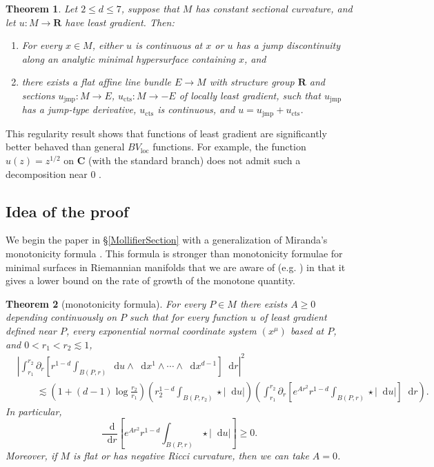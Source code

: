 \documentclass[reqno,10pt]{amsart}
\newcommand{\RR}{\mathbf{R}}
\newcommand{\CC}{\mathbf{C}}
\newcommand*\dif{\mathop{}\!\mathrm{d}}
\newcommand{\loc}{\mathrm{loc}}
\newtheorem{mainthm}{Theorem}
\theoremstyle{definition}
\numberwithin{equation}{section}
\begin{document}
\begin{mainthm}\label{Gorny regularity}
Let $2 \leq d \leq 7$, suppose that $M$ has constant sectional curvature, and let $u: M \to \RR$ have least gradient.
Then:
\begin{enumerate}
\item For every $x \in M$, either $u$ is continuous at $x$ or $u$ has a jump discontinuity along an analytic minimal hypersurface containing $x$, and
\item there exists a flat affine line bundle $E \to M$ with structure group $\RR$ and sections $u_{\text{jmp}}: M \to E$, $u_{\text{cts}}: M \to -E$ of locally least gradient, such that $u_{\text{jmp}}$ has a jump-type derivative, $u_{\text{cts}}$ is continuous, and $u = u_{\text{jmp}} + u_{\text{cts}}$.
\end{enumerate}
\end{mainthm}

This regularity result shows that functions of least gradient are significantly better behaved than general $BV_\loc$ functions.
For example, the function $u(z) = z^{1/2}$ on $\CC$ (with the standard branch) does not admit such a decomposition near $0$ \cite[Example 4.1]{Ambrosio2000FunctionsOB}.


\subsection{Idea of the proof}
We begin the paper in \S\ref{MollifierSection} with a generalization of Miranda's monotonicity formula \cite[Theorem 2.8]{Miranda66}.
This formula is stronger than monotonicity formulae for minimal surfaces in Riemannian manifolds that we are aware of (e.g. \cite[\S7]{MarquesXX}) in that it gives a lower bound on the rate of growth of the monotone quantity.

\begin{mainthm}[monotonicity formula]\label{monotonicity prestate}
For every $P \in M$ there exists $A \geq 0$ depending continuously on $P$ such that for every function $u$ of least gradient defined near $P$, every exponential normal coordinate system $(x^\mu)$ based at $P$, and $0 < r_1 < r_2 \lesssim 1$,
\begin{align*}
&\left|\int_{r_1}^{r_2} \partial_r \left[r^{1 - d} \int_{B(P, r)} \dif u \wedge \dif x^1 \wedge \cdots \wedge \dif x^{d - 1}\right] \dif r\right|^2 \\
&\qquad \lesssim \left(1 + (d - 1) \log \frac{r_2}{r_1}\right) \left(r_2^{1 - d}\int_{B(P, r_2)} \star |\dif u| \right)\left(\int_{r_1}^{r_2} \partial_r \left[e^{Ar^2} r^{1 - d} \int_{B(P, r)} \star |\dif u|\right] \dif r\right).
\end{align*}
In particular,
\begin{equation}\label{weak monotonicity}
\frac{\dif}{\dif r} \left[e^{Ar^2} r^{1 - d} \int_{B(P, r)} \star |\dif u|\right] \geq 0.
\end{equation}
Moreover, if $M$ is flat or has negative Ricci curvature, then we can take $A = 0$.
\end{mainthm}
\end{document}
